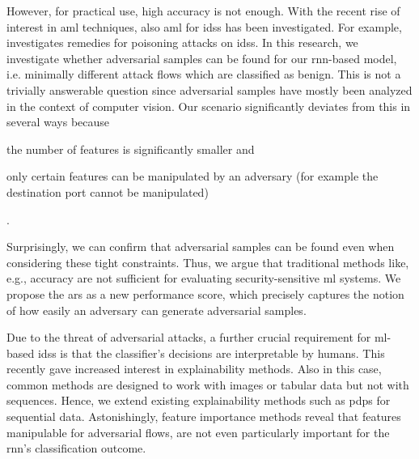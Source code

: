 \documentclass[conference]{IEEEtran}
\begin{document}
However, for practical use, high accuracy is not enough. With the recent rise of interest in \gls{aml} techniques, also \gls{aml} for \glspl{ids} has been investigated. For example, \cite{bachl_walling_2019} investigates remedies for poisoning attacks on \glspl{ids}.
In this research, we investigate whether adversarial samples can be found for our \gls{rnn}-based model, i.e. minimally different attack flows which are classified as benign. This is not a trivially answerable question since adversarial samples have mostly been analyzed in the context of computer vision. Our scenario significantly deviates from this in several ways because \begin{enumerate*}
\item the number of features is significantly smaller and
\item only certain features can be manipulated by an adversary (for example the destination port cannot be manipulated)
\end{enumerate*}.

Surprisingly, we can confirm that adversarial samples can be found even when considering these tight constraints. %
Thus, we argue that traditional methods like, e.g., accuracy are not sufficient for evaluating security-sensitive \gls{ml} systems.
We propose the \acrfull{ars} as a new performance score, which precisely captures the notion of how easily an adversary can generate adversarial samples.

Due to the threat of adversarial attacks, a further crucial requirement for \gls{ml}-based \glspl{ids} is that the classifier's decisions are interpretable by humans. This recently gave increased interest in explainability methods. Also in this case, common methods are designed to work with images or tabular data but not with sequences. Hence, we extend existing explainability methods such as \glspl{pdp} \cite{friedman_greedy_2001} for sequential data. %
Astonishingly, feature importance methods reveal that
features manipulable for adversarial flows,
are not even particularly important for the \gls{rnn}'s classification outcome. %

\end{document}
